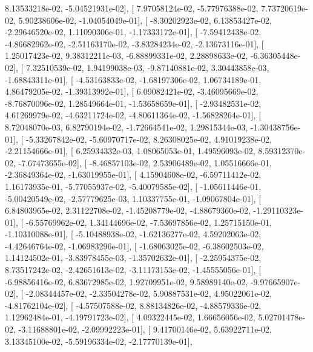 \documentclass{article}
\begin{document}
          8.13533218e-02,  -5.04521931e-02],
       [  7.97058124e-02,  -5.77976388e-02,   7.73720619e-02,
          5.90238606e-02,  -1.04054049e-01],
       [ -8.30202923e-02,   6.13853427e-02,  -2.29646520e-02,
          1.11090306e-01,  -1.17333172e-01],
       [ -7.59412438e-02,  -4.86682962e-02,  -2.51163170e-02,
         -3.83284234e-02,  -2.13673116e-01],
       [  1.25017423e-02,   9.38312211e-03,  -6.88899331e-02,
          2.28898633e-02,  -6.36305448e-02],
       [  7.32510539e-02,   1.94199038e-03,  -9.87140881e-02,
          3.30443858e-03,  -1.68843311e-01],
       [ -4.53163833e-02,  -1.68197306e-02,   1.06734189e-01,
          4.86479205e-02,  -1.39313992e-01],
       [  6.09082421e-02,  -3.46095669e-02,  -8.76870096e-02,
          1.28549664e-01,  -1.53658659e-01],
       [ -2.93482531e-02,   4.61269979e-02,  -4.63211724e-02,
         -4.80611364e-02,  -1.56828264e-01],
       [  8.72048070e-03,   6.82790194e-02,  -1.72664541e-02,
          1.29815344e-03,  -1.30438756e-01],
       [ -5.33267842e-02,  -5.60970717e-02,   8.26308025e-02,
          4.91019238e-02,  -2.21154666e-01],
       [  6.25934332e-03,   1.08065053e-01,   1.49596093e-02,
          8.59312370e-02,  -7.67473655e-02],
       [ -8.46857103e-02,   2.53906489e-02,   1.05516666e-01,
         -2.36849364e-02,  -1.63019955e-01],
       [  4.15904608e-02,  -6.59711412e-02,   1.16173935e-01,
         -5.77055937e-02,  -5.40079585e-02],
       [ -1.05611446e-01,  -5.00420549e-02,  -2.57779625e-03,
          1.10337755e-01,  -1.09067804e-01],
       [  6.84803965e-02,   2.31122708e-02,  -1.45208779e-02,
         -4.88679360e-02,  -1.29110323e-01],
       [ -6.55769962e-02,   1.34144696e-02,  -7.53697856e-02,
          1.25715150e-01,  -1.10310088e-01],
       [ -5.10488938e-02,  -1.62136277e-02,   4.59202063e-02,
         -4.42646764e-02,  -1.06983296e-01],
       [ -1.68063025e-02,  -6.38602503e-02,   1.14124502e-01,
         -3.83978455e-03,  -1.35702632e-01],
       [ -2.25954375e-02,   8.73517242e-02,  -2.42651613e-02,
         -3.11173153e-02,  -1.45555056e-01],
       [ -6.98856416e-02,   6.83672985e-02,   1.92709951e-02,
          9.58989140e-02,  -9.97665907e-02],
       [ -2.08344457e-02,  -2.33504278e-02,   5.90887531e-02,
          4.95022061e-02,  -4.81762104e-02],
       [ -4.57507588e-02,   8.88134826e-02,  -4.88579336e-02,
          1.12962484e-01,  -4.19791723e-02],
       [  4.09322445e-02,   1.66656056e-02,   5.02701478e-02,
         -3.11688801e-02,  -2.09992223e-01],
       [  9.41700146e-02,   5.63922711e-02,   3.13345100e-02,
         -5.59196334e-02,  -2.17770139e-01],
\end{document}
